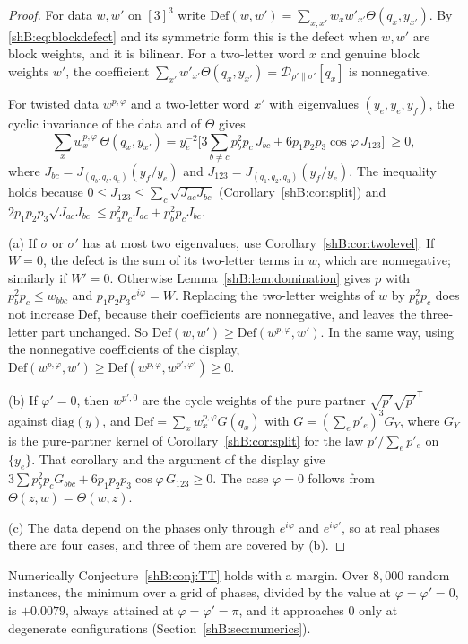 \begin{proof}
For data $w,w'$ on $[3]^3$ write $\mathrm{Def}(w,w')=\sum_{x,x'}w_xw'_{x'}\Theta(q_x,y_{x'})$. By \eqref{shB:eq:blockdefect} and its symmetric form this is the defect when $w,w'$ are block weights, and it is bilinear. For a two-letter word $x$ and genuine block weights $w'$, the coefficient $\sum_{x'}w'_{x'}\Theta(q_x,y_{x'})=\mathcal D_{\rho'\|\sigma'}[q_x]$ is nonnegative.

For twisted data $w^{p,\varphi}$ and a two-letter word $x'$ with eigenvalues $(y_e,y_e,y_f)$, the cyclic invariance of the data and of $\Theta$ gives
\[
\sum_xw^{p,\varphi}_x\,\Theta(q_x,y_{x'})=y_e^{-2}\Big[3\sum_{b\ne c}p_b^2p_c\,J_{bc}+6p_1p_2p_3\cos\varphi\,J_{123}\Big]\ \ge0,
\]
where $J_{bc}=J_{(q_b,q_b,q_c)}(y_f/y_e)$ and $J_{123}=J_{(q_1,q_2,q_3)}(y_f/y_e)$.
The inequality holds because $0\le J_{123}\le\sum_c\sqrt{J_{ac}J_{bc}}$ (Corollary~\ref{shB:cor:split}) and $2p_1p_2p_3\sqrt{J_{ac}J_{bc}}\le p_a^2p_cJ_{ac}+p_b^2p_cJ_{bc}$.

(a) If $\sigma$ or $\sigma'$ has at most two eigenvalues, use Corollary~\ref{shB:cor:twolevel}. If $W=0$, the defect is the sum of its two-letter terms in $w$, which are nonnegative; similarly if $W'=0$. Otherwise Lemma~\ref{shB:lem:domination} gives $p$ with $p_b^2p_c\le w_{bbc}$ and $p_1p_2p_3e^{i\varphi}=W$. Replacing the two-letter weights of $w$ by $p_b^2p_c$ does not increase $\mathrm{Def}$, because their coefficients are nonnegative, and leaves the three-letter part unchanged. So $\mathrm{Def}(w,w')\ge\mathrm{Def}(w^{p,\varphi},w')$. In the same way, using the nonnegative coefficients of the display, $\mathrm{Def}(w^{p,\varphi},w')\ge\mathrm{Def}(w^{p,\varphi},w^{p',\varphi'})\ge0$.

(b) If $\varphi'=0$, then $w^{p',0}$ are the cycle weights of the pure partner $\sqrt{p'}\sqrt{p'}^{\mathsf T}$ against $\mathrm{diag}(y)$, and $\mathrm{Def}=\sum_xw^{p,\varphi}_xG(q_x)$ with $G=(\sum_ep'_e)^3G_Y$, where $G_Y$ is the pure-partner kernel of Corollary~\ref{shB:cor:split} for the law $p'/\sum_ep'_e$ on $\{y_e\}$. That corollary and the argument of the display give $3\sum p_b^2p_cG_{bbc}+6p_1p_2p_3\cos\varphi\,G_{123}\ge0$. The case $\varphi=0$ follows from $\Theta(z,w)=\Theta(w,z)$.

(c) The data depend on the phases only through $e^{i\varphi}$ and $e^{i\varphi'}$, so at real phases there are four cases, and three of them are covered by (b).
\end{proof}

Numerically Conjecture~\ref{shB:conj:TT} holds with a margin. Over $8{,}000$ random instances, the minimum over a grid of phases, divided by the value at $\varphi=\varphi'=0$, is $+0.0079$, always attained at $\varphi=\varphi'=\pi$, and it approaches $0$ only at degenerate configurations (Section~\ref{shB:sec:numerics}).

